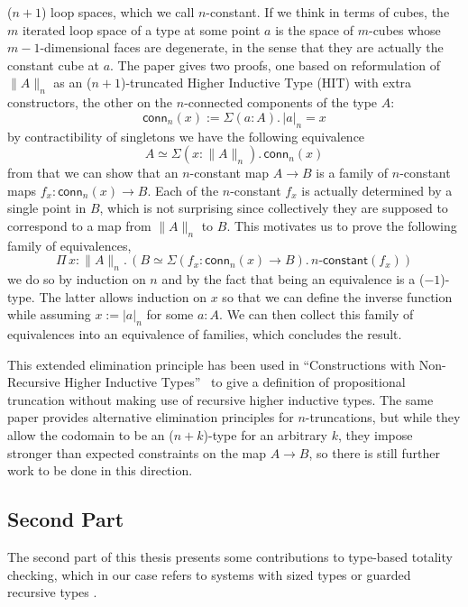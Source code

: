 \documentclass{book}
\newcommand{\tr}[2]{\| #2 \|_{#1}}
\newcommand{\trcon}[2]{| #2 |_{#1}}
\newcommand{\conn}{\mathsf{conn}}
\newcommand{\sd}{.\,}
\begin{document}
($n{+}1$) loop spaces, which we call $n$-constant.
If we think in terms of cubes, the $m$ iterated loop space of a type at some point $a$
is the space of $m$-cubes whose $m{-}1$-dimensional faces are
degenerate, in the sense that they are actually the constant cube at $a$.
The paper gives two proofs, one based on reformulation of $\tr{n}{A}$
as an ($n{+}1$)-truncated Higher Inductive Type (HIT) \cite{hottbook}
with extra constructors, the other on the
$n$-connected components of the type $A$:
\[
\conn_n(x) := \Sigma (a : A)\sd \trcon{n}{a} = x
\]
by contractibility of singletons we have the following equivalence
\[
A \simeq \Sigma (x : \tr{n}{A})\sd \conn_n(x)
\]
from that we can show that an $n$-constant map $A \to B$ is a family of $n$-constant
maps $f_x : \conn_n(x) \to B$. Each of the $n$-constant $f_x$ is actually
determined by a single point in $B$, which is not surprising since
collectively they are supposed to correspond to a map from
$\tr{n}{A}$ to $B$. This motivates us to prove the following family of equivalences,
\[
\Pi\,x : \tr{n}{A}\sd (B \simeq \Sigma (f_x : \conn_n(x) \to B)\sd\textsf{$n$-constant}(f_x))
\]
we do so by induction on $n$ and by the fact that being an equivalence
is a ($-1$)-type. The latter allows induction on $x$ so that we can
define the inverse function while assuming $x := \trcon{n}{a}$ for some
$a : A$.
We can then collect this
family of equivalences into an equivalence of families, which
concludes the result.

This extended elimination principle has been used in ``Constructions
with Non-Recursive Higher Inductive Types''~\cite{kraus:lics16} to give a
definition of propositional truncation without making use of recursive
higher inductive types. The same paper provides alternative
elimination principles for $n$-truncations, but while they allow the
codomain to be an ($n{+}k$)-type for an arbitrary $k$, they impose
stronger than expected constraints on the map $A \to B$, so there is
still further work to be done in this direction.



\subsection{Second Part}

The second part of this thesis presents some contributions to
type-based totality checking, which in our case refers to systems with
sized types \cite{hughesParetoSabry:popl96} or guarded recursive types
\cite{nakano:lics00}.
\end{document}
